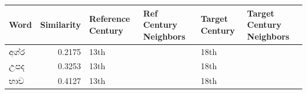 ﻿\begin{tabular}{lrllll}
\toprule
Word & Similarity & Reference Century & Ref Century Neighbors & Target Century & Target Century Neighbors \\
\midrule
අග්ර & 0.2175 & 13th & & 18th & \\
උපද & 0.3253 & 13th & & 18th & \\
භාව & 0.4127 & 13th & & 18th & \\
\bottomrule
\end{tabular}
